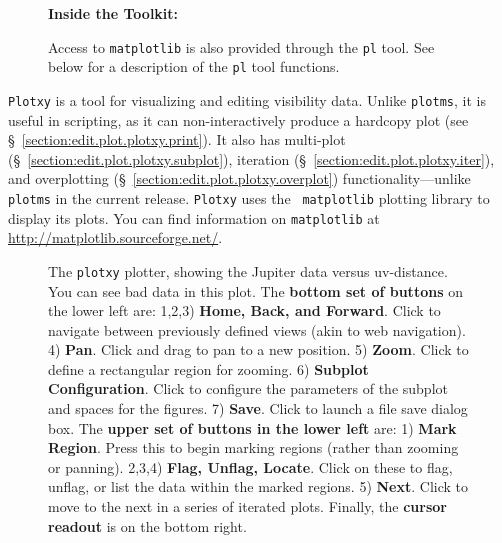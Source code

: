 \begin{wrapfigure}{r}{2.5in}
  \begin{boxedminipage}{2.5in}
     \centerline{\bf Inside the Toolkit:}
     Access to {\tt matplotlib} is also provided through 
     the {\tt pl} tool. 
     See below for a description of the {\tt pl} tool functions. 
  \end{boxedminipage}
\end{wrapfigure}



{\tt Plotxy} is a tool for visualizing and editing visibility
data. Unlike {\tt plotms}, it is useful in scripting, as it can
non-interactively produce a hardcopy plot (see
\S~\ref{section:edit.plot.plotxy.print}). It also has multi-plot
(\S~\ref{section:edit.plot.plotxy.subplot}), iteration
(\S~\ref{section:edit.plot.plotxy.iter}), and overplotting
(\S~\ref{section:edit.plot.plotxy.overplot}) functionality---unlike
{\tt plotms} in the current release. {\tt Plotxy} uses the {\tt
  matplotlib} plotting library to display its plots. You can find
information on {\tt matplotlib} at
\url{http://matplotlib.sourceforge.net/}.




\begin{figure}[h!]
\begin{center}
\caption{\label{fig:matplotlib}The {\tt plotxy} plotter, showing the
  Jupiter data versus uv-distance.  You can see bad data in this plot.
  The {\bf bottom set of buttons} on the
  lower left are: 1,2,3) {\bf Home, Back, and Forward}. Click to
  navigate between previously defined views (akin to web navigation).
  4) {\bf Pan}. Click and drag to pan to a new position. 5) {\bf
  Zoom}. Click to define a rectangular region for zooming. 6) {\bf
  Subplot Configuration}. Click to configure the parameters of the
  subplot and spaces for the figures. 7) {\bf Save}. Click to launch a
  file save dialog box.  The {\bf upper set of buttons in the lower left} are:
  1) {\bf Mark Region}. Press this to begin marking regions (rather than
  zooming or panning).  2,3,4) {\bf Flag, Unflag, Locate}.  Click on these
  to flag, unflag, or list the data within the marked regions.  5) {\bf Next}.
  Click to move to the next in a series of iterated plots.
  Finally, the {\bf cursor readout} is on the bottom right.}
\hrulefill
\end{center}
\end{figure}

